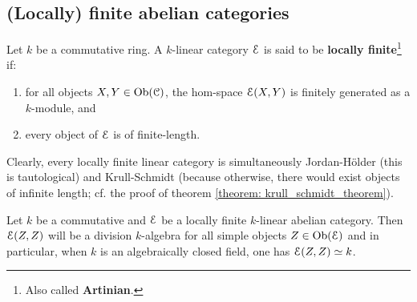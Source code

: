         \subsection{(Locally) finite abelian categories}
            \begin{definition} \label{def: locally_finite_linear_categories}
                Let $k$ be a commutative ring. A $k$-linear category $\mathcal{E}$ is said to be \textbf{locally finite}\footnote{Also called \textbf{Artinian}.} if:
                    \begin{enumerate}
                        \item for all objects $X, Y \in \mathrm{Ob}(\mathcal{C})$, the hom-space $\mathcal{E}(X, Y)$ is finitely generated as a $k$-module, and
                        \item every object of $\mathcal{E}$ is of finite-length.
                    \end{enumerate}
            \end{definition}
            \begin{remark} \label{remark: locally_finite_linear_categories_are_jordan_holder_and_krull_schmidt}
                Clearly, every locally finite linear category is simultaneously Jordan-H\"older (this is tautological) and Krull-Schmidt (because otherwise, there would exist objects of infinite length; cf. the proof of theorem \ref{theorem: krull_schmidt_theorem}).
            \end{remark}
            \begin{proposition} \label{prop: endomorphism_algebras_of_simple_objects_in_locally_finite_linear_categories}
                Let $k$ be a commutative and $\mathcal{E}$ be a locally finite $k$-linear abelian category. Then $\mathcal{E}(Z, Z)$ will be a division $k$-algebra for all simple objects $Z \in \mathrm{Ob}(\mathcal{E})$ and in particular, when $k$ is an algebraically closed field, one has $\mathcal{E}(Z, Z) \simeq k$.
            \end{proposition}
